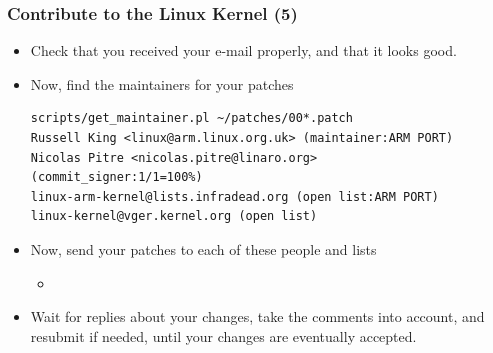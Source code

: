 \begin{frame}[fragile]
  \frametitle{Contribute to the Linux Kernel (5)}
  \begin{itemize}
  \item Check that you received your e-mail properly, and that it
    looks good.
  \item Now, find the maintainers for your patches
{\scriptsize
\begin{verbatim}
scripts/get_maintainer.pl ~/patches/00*.patch
Russell King <linux@arm.linux.org.uk> (maintainer:ARM PORT)
Nicolas Pitre <nicolas.pitre@linaro.org>
(commit_signer:1/1=100%)
linux-arm-kernel@lists.infradead.org (open list:ARM PORT)
linux-kernel@vger.kernel.org (open list)
\end{verbatim}
}
  \item Now, send your patches to each of these people and lists
    \begin{itemize}
    \item {}
    \end{itemize}
  \item Wait for replies about your changes, take the comments into
    account, and resubmit if needed, until your changes are eventually
    accepted.
  \end{itemize}
\end{frame}

